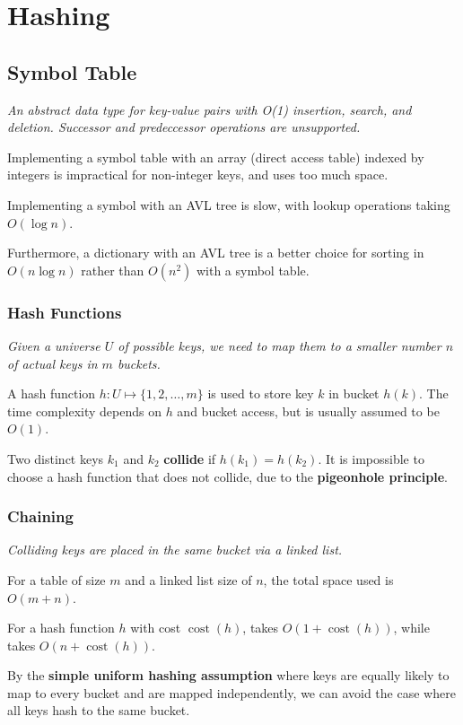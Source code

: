 \section{Hashing}

\subsection{Symbol Table}
\emph{An abstract data type for key-value pairs with O(1) insertion, search, and deletion. Successor and predeccessor operations are unsupported.}

Implementing a symbol table with an array (direct access table) indexed by integers is impractical for non-integer keys, and uses too much space.

Implementing a symbol with an AVL tree is slow, with lookup operations taking $O(\log n)$.

Furthermore, a dictionary with an AVL tree is a better choice for sorting in $O(n \log n)$ rather than $O(n^2)$ with a symbol table.

\subsubsection{Hash Functions}
\emph{Given a universe $U$ of possible keys, we need to map them to a smaller number $n$ of actual keys in $m$ buckets.}

A hash function $h: U \mapsto \{ 1, 2, \dots, m \}$ is used to store key $k$ in bucket $h(k)$.
The time complexity depends on $h$ and bucket access, but is usually assumed to be $O(1)$.

Two distinct keys $k_1$ and $k_2$ \textbf{collide} if $h(k_1) = h(k_2)$.
It is impossible to choose a hash function that does not collide, due to the \textbf{pigeonhole principle}.

\subsubsection{Chaining}
\emph{Colliding keys are placed in the same bucket via a linked list.}

For a table of size $m$ and a linked list size of $n$, the total space used is $O(m + n)$.

For a hash function $h$ with cost $\operatorname{cost}(h)$,  takes $O(1 + \operatorname{cost}(h))$,
while  takes $O(n + \operatorname{cost}(h))$.

By the \textbf{simple uniform hashing assumption} where keys are equally likely to map to every bucket and are mapped independently,
we can avoid the case where all keys hash to the same bucket.

